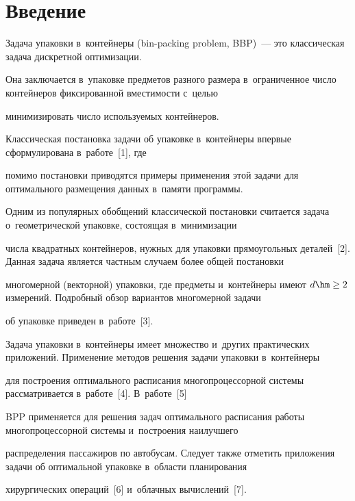 \section{Введение}



Задача упаковки в~контейнеры (bin-packing problem, BBP)~--- это классическая задача дискретной оптимизации. 

Она заключается в~упаковке предметов разного размера в~ограниченное чис\-ло контейнеров фиксированной вмес\-ти\-мости с~\mbox{целью} 

минимизировать чис\-ло ис\-поль\-зу\-емых контейнеров.



Классическая постановка задачи об упаковке в~контейнеры впер\-вые сформулирована в~работе~[1], где 

помимо по\-ста\-нов\-ки приводятся примеры применения этой задачи для оптимального размещения данных в~памяти программы. 

Одним из популярных обобщений классической по\-ста\-нов\-ки считается задача о~гео\-мет\-ри\-че\-ской упаковке, со\-сто\-ящая в~минимизации 

чис\-ла квадратных контейнеров, нуж\-ных для упаковки прямоугольных деталей~[2]. Данная задача является част\-ным случаем более общей постановки 

мно\-го\-мер\-ной (векторной) упа\-ков\-ки, где предметы и~контейнеры имеют $d \hm\geq 2$ измерений. По\-дроб\-ный обзор вариантов многомерной задачи

 об упаковке приведен в~работе~[3].

 {

 

 }



Задача упаковки в~контейнеры имеет множество и~других практических приложений. Применение методов решения задачи упа\-ков\-ки в~контейнеры 

для по\-стро\-ения оптимального расписания многопроцессорной сис\-те\-мы рас\-смат\-ри\-ва\-ет\-ся  в~работе~[4]. В~работе~[5]  

BPP применяется для решения задач оптимального расписания работы многопроцессорной сис\-те\-мы и~по\-стро\-ения наилучшего 

рас\-пре\-де\-ле\-ния пассажиров по автобусам. Следует так\-же отметить приложения задачи об оптимальной упаковке в~об\-ласти планирования 

хирургических операций~[6] и~облачных вы\-чис\-ле\-ний~[7].







